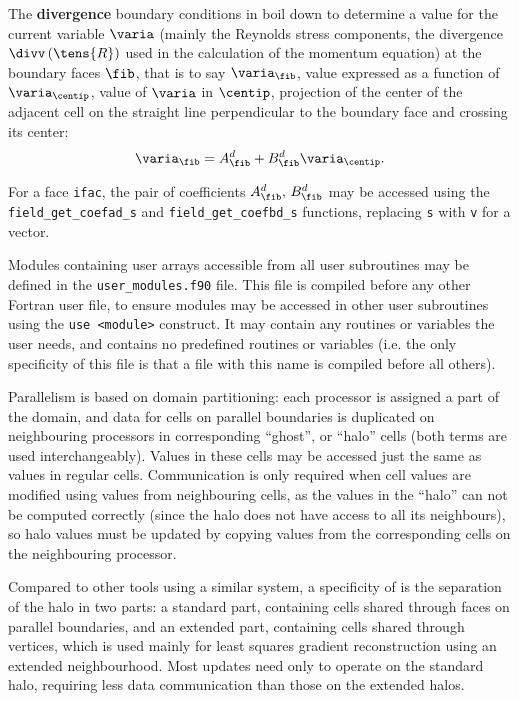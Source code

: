 {{{{The \textbf{divergence} boundary conditions in \CS boil down to determine a value for the
current variable $\varia$ (mainly the Reynolds stress components, the divergence $\divv \left(\tens{R} \right)$ used in the calculation of the momentum equation) at the boundary faces $\fib$,
that is to say $\varia_\fib$,
value expressed as a function of $\varia_{\centip}$, value of $\varia$ in $\centip$,
projection of the center of the adjacent cell on the straight line
perpendicular to the boundary face and crossing its center:
\begin{equation}
\varia_\fib=A_{\fib}^d +B_{\fib}^d \varia_{\centip}.
\end{equation}

For a face \texttt{ifac}, the pair of coefficients $A_{\fib}^d , \, B_{\fib}^d$
may be accessed using the \texttt{field\_get\_coefad\_s} and
\texttt{field\_get\_coefbd\_s} functions, replacing \texttt{s} with \texttt{v}
for a vector.

\clearpage
Modules containing user arrays accessible from all user subroutines may
be defined in the \texttt{user\_modules.f90} file. This file is
compiled before any other Fortran user file, to ensure modules
may be accessed in other user subroutines using the \texttt{use <module>}
construct. It may contain any routines or variables the user needs,
and contains no predefined routines or variables (i.e. the only
specificity of this file is that a file with this name is compiled before
all others).


Parallelism is based on domain partitioning: each processor is assigned
a part of the domain, and data for cells on parallel boundaries
is duplicated on neighbouring processors in corresponding ``ghost'',
or ``halo'' cells (both terms are used interchangeably). Values in
these cells may be accessed just the same as values in regular cells.
Communication is only required when cell values are modified
using values from neighbouring cells, as the values in the ``halo'' can
not be computed correctly (since the halo does not have access to all
its neighbours), so halo values must be updated by copying values from
the corresponding cells on the neighbouring processor.

Compared to other tools using a similar system, a specificity of
\CS is the separation of the halo in two parts: a standard part,
containing cells shared through faces on parallel boundaries, and an
extended part, containing cells shared through vertices, which is
used mainly for least squares gradient reconstruction using an
extended neighbourhood. Most updates need only to operate on the standard
halo, requiring less data communication than those on the extended halos.

}}}}
